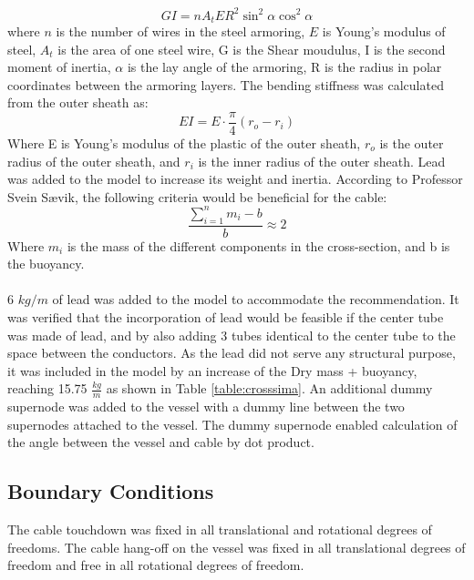 \begin{equation}
    GI=nA_t E R^2 \sin^2 \alpha \cos^2 \alpha
\end{equation}
where $n$ is the number of wires in the steel armoring, $E$ is Young's modulus of steel, $A_t$ is the area of one steel wire, G is the Shear moudulus, I is the second moment of inertia, $\alpha$ is the lay angle of the armoring, R is the radius in polar coordinates between the armoring layers.  \newline
\newline 
The bending stiffness was calculated from the outer sheath as:
\begin{equation}
    EI= E\cdot \frac{\pi}{4}(r_o-r_i)
\end{equation}
Where E is Young's modulus of the plastic of the outer sheath, $r_o$ is the outer radius of the outer sheath, and $r_i$ is the inner radius of the outer sheath. \newline
\newline 
Lead was added to the model to increase its weight and inertia. According to Professor Svein Sævik, the following criteria would be beneficial for the cable:
\begin{equation}
    \frac{\sum_{i=1}^n m_i - b}{b}\approx 2
\end{equation}
Where $m_i$ is the mass of the different components in the cross-section, and b is the buoyancy.\\\\ 6 $kg/m$ of lead was added to the model to accommodate the recommendation. It was verified that the incorporation of lead would be feasible if the center tube was made of lead, and by also adding 3 tubes identical to the center tube to the space between the conductors. As the lead did not serve any structural purpose, it was included in the model by an increase of the Dry mass + buoyancy, reaching 15.75 $\frac{kg}{m}$ as shown in Table \ref{table:crosssima}. \newline
\newline An additional dummy supernode was added to the vessel with a dummy line between the two supernodes attached to the vessel. The dummy supernode enabled calculation of the angle between the vessel and cable by dot product. 

\subsection{Boundary Conditions}
The cable touchdown was fixed in all translational and rotational degrees of freedoms. The cable hang-off on the vessel was fixed in all translational degrees of freedom and free in all rotational degrees of freedom. 

